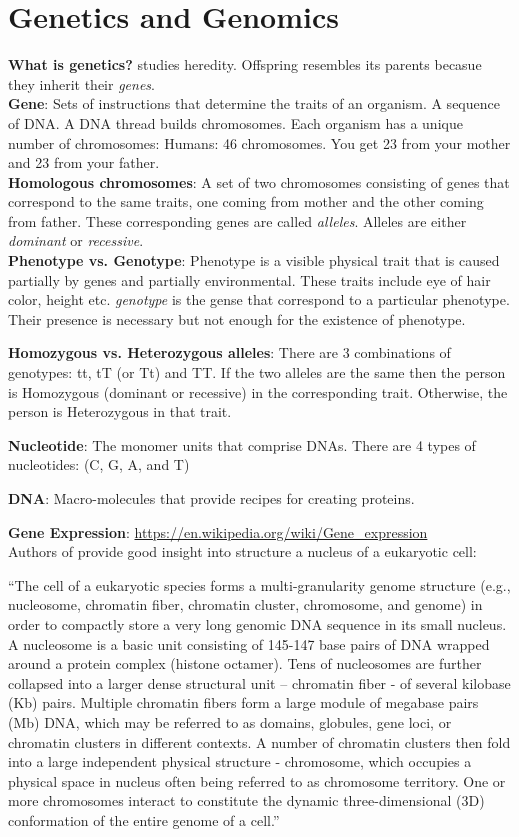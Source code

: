 \documentclass{article}
\begin{document}
\section{Genetics and Genomics}
\textbf{What is genetics?}
studies heredity. Offspring resembles its parents becasue they
inherit their \textit{genes}.\\
\textbf{Gene}: Sets of instructions that determine the traits of an organism.
A sequence of DNA. A DNA thread builds chromosomes.
Each organism has a unique number of chromosomes:
Humans: 46 chromosomes. You get 23 from your mother and 23 from your
father.\\
\textbf{Homologous chromosomes}: A set of two chromosomes consisting of genes
that correspond to the same traits, one coming from mother and the 
other coming from father. These corresponding genes are called
\textit{alleles}. Alleles are either \textit{dominant} or \textit{
    recessive}.\\
\textbf{Phenotype vs. Genotype}: Phenotype is a visible physical trait that
is caused partially by genes and partially environmental.
These traits include eye of hair color, height etc.
\textit{genotype} is the gense that correspond to a particular
phenotype. 
Their presence is necessary but not enough for the 
existence of phenotype.

\textbf{Homozygous vs. Heterozygous alleles}:
There are 3 combinations of genotypes:
tt, tT (or Tt) and TT. 
If the two alleles are the same
then the person is Homozygous (dominant or recessive)
in the corresponding
trait. Otherwise, the person is Heterozygous in that trait.

\textbf{Nucleotide}:  The monomer units that comprise DNAs. There
 are 4 types of nucleotides: (C, G, A, and T)

\textbf{DNA}: Macro-molecules that provide recipes for creating 
proteins.

\textbf{Gene Expression}:
\url{https://en.wikipedia.org/wiki/Gene_expression} \\
Authors of \cite{wang2013properties} provide good insight into structure a nucleus
of a eukaryotic cell: \\
\begin{displayquote}
``The cell of a eukaryotic species forms a multi-granularity genome structure
(e.g., nucleosome, chromatin fiber, chromatin cluster, chromosome,
and genome) in order to compactly store a very long genomic 
DNA sequence in its small nucleus. A nucleosome is a basic unit 
consisting of 145-147 base pairs of DNA wrapped around a
protein complex (histone octamer). Tens of nucleosomes are
further collapsed into a larger dense structural unit
– chromatin fiber - of several kilobase (Kb) pairs.
Multiple chromatin fibers form a large module of megabase pairs 
(Mb) DNA, which may be referred to as domains, globules, gene
loci, or chromatin clusters in different contexts.
A number of chromatin clusters then fold into a large
independent physical structure - chromosome,
which occupies a physical space in nucleus often
being referred to as chromosome territory.
One or more chromosomes interact to constitute the dynamic
three-dimensional (3D) conformation of the entire genome of a cell.''
\end{displayquote}
\end{document}
